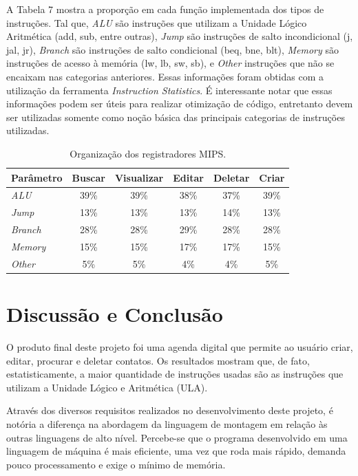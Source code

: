 \documentclass[10pt,twocolumn,letterpaper]{article}
\begin{document}
A Tabela 7 mostra a proporção em cada função implementada dos tipos de instruções. Tal que, \textit{ALU} são instruções que utilizam a Unidade Lógico Aritmética (add, sub, entre outras), \textit{Jump} são instruções de salto incondicional (j, jal, jr), \textit{Branch} são instruções de salto condicional (beq, bne, blt), \textit{Memory} são instruções de acesso à memória (lw, lb, sw, sb), e \textit{Other} instruções que não se encaixam nas categorias anteriores.
Essas informações foram obtidas com a utilização da ferramenta \textit{Instruction Statistics}. É interessante notar que essas informações podem ser úteis para realizar otimização de código, entretanto devem ser utilizadas somente como noção básica das principais categorias de instruções utilizadas.

\begin{table}[h]
\renewcommand{\tablename}{Tabela}
\begin{center}
\begin{tabular}{|l|c|c|c|c|c|}
\hline
Parâmetro & Buscar & Visualizar & Editar & Deletar & Criar \\
\hline\hline
\textit{ALU} & 39\% & 39\% & 38\% & 37\% & 39\%\\
\textit{Jump} & 13\% & 13\% & 13\% & 14\% & 13\%\\
\textit{Branch} & 28\% & 28\% & 29\% & 28\% & 28\%\\
\textit{Memory} & 15\% & 15\% & 17\% & 17\% & 15\%\\
\textit{Other} & 5\% & 5\% & 4\% & 4\% & 5\%\\
\hline
\end{tabular}
\end{center}
\caption{Organização dos registradores MIPS.}
\end{table}

\section{Discussão e Conclusão}

O produto final deste projeto foi uma agenda digital que permite ao usuário criar, editar, procurar e deletar contatos. Os resultados mostram que, de fato, estatisticamente, a maior quantidade de instruções usadas são as instruções que utilizam a Unidade Lógico e Aritmética (ULA). 

Através dos diversos requisitos realizados no desenvolvimento deste projeto, é notória a diferença na abordagem da linguagem de montagem em relação às outras linguagens de alto nível. Percebe-se que o programa desenvolvido em uma linguagem de máquina é mais eficiente, uma vez que roda mais rápido, demanda pouco processamento e exige o mínimo de memória.
\end{document}
